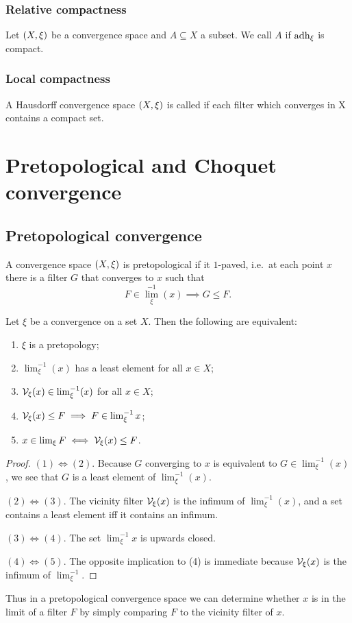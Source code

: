 \subsection{Relative compactness}
\begin{definition}
Let $\left( X,\xi \right)$ be a convergence space and $A\subseteq X$ a subset. We call $A$  if $\operatorname{adh}_\xi$ is compact.
\end{definition}

\subsection{Local compactness}
\begin{definition}
A Hausdorff convergence space $\left( X, \xi \right)$ is called 
if each filter which converges in X contains a compact set.
\end{definition}

\chapter{Pretopological and Choquet convergence}
\section{Pretopological convergence}
A convergence space $\left( X,\xi \right)$ is pretopological if it $1$-paved, i.e.\ at each point $x$ there is a filter $G$ that converges to $x$ such that
\[ F\in {\lim}_\xi^{-1}(x) \implies G \leq F. \]

\begin{lemma}
Let $\xi$ be a convergence on a set $X$. Then the following are equivalent:
\begin{enumerate}
\item $\xi$ is a pretopology;
\item $\lim_\xi^{-1}(x)$ has a least element for all $x\in X$;
\item $\mathcal{V}_\xi(x) \in \lim_\xi^{-1}(x)$ for all $x\in X$;
\item $\mathcal{V}_\xi(x) \leq F \implies F\in\lim^{-1}_\xi x$;
\item $x\in\lim_\xi F \iff \mathcal{V}_\xi(x) \leq F$.
\end{enumerate}
\end{lemma}
\begin{proof}
$(1) \Leftrightarrow (2)$. Because $G$ converging to $x$ is equivalent to $G\in \lim_\xi^{-1}(x)$, we see that $G$ is a least element of $\lim_\xi^{-1}(x)$.

$(2) \Leftrightarrow (3)$. The vicinity filter $\mathcal{V}_\xi(x)$ is the infimum of $\lim_\xi^{-1}(x)$, and a set contains a least element iff it contains an infimum.

$(3) \Leftrightarrow (4)$. The set $\lim^{-1}_\xi x$ is upwards closed.

$(4) \Leftrightarrow (5)$. The opposite implication to (4) is immediate because $\mathcal{V}_\xi(x)$ is the infimum of $\lim^{-1}_\xi$.
\end{proof}
Thus in a pretopological convergence space we can determine whether $x$ is in the limit of a filter $F$ by simply comparing $F$ to the vicinity filter of $x$.

